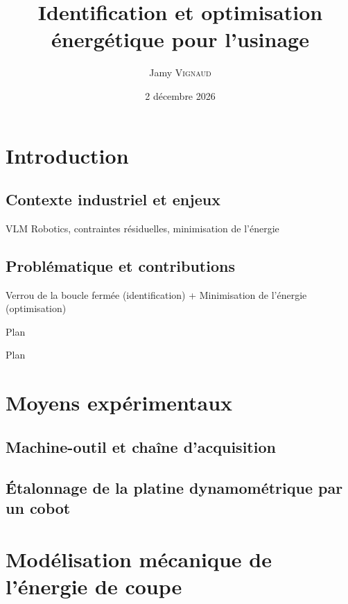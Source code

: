 \documentclass{style/presentation}
\title{Identification et optimisation énergétique pour l'usinage}
\author{Jamy \textsc{Vignaud}}
\institute{IMS, I2M, VLM Robotics}
\date{2 décembre 2026}
\begin{document}
\frame{\titlepage}

\section{Introduction}

\subsection{Contexte industriel et enjeux}

\begin{frame}
    VLM Robotics, contraintes résiduelles, minimisation de l'énergie
\end{frame}

\subsection{Problématique et contributions}

\begin{frame}
    Verrou de la boucle fermée (identification) + Minimisation de l'énergie (optimisation)

    Plan
\end{frame}

\begin{frame}[sanssoustitre]{Plan}
    \tableofcontents
\end{frame}

\section{Moyens expérimentaux}

\subsection{Machine-outil et chaîne d'acquisition}

\begin{frame}

\end{frame}

\subsection{Étalonnage de la platine dynamométrique par un cobot}

\begin{frame}

\end{frame}

\section{Modélisation mécanique de l'énergie de coupe}
\end{document}
